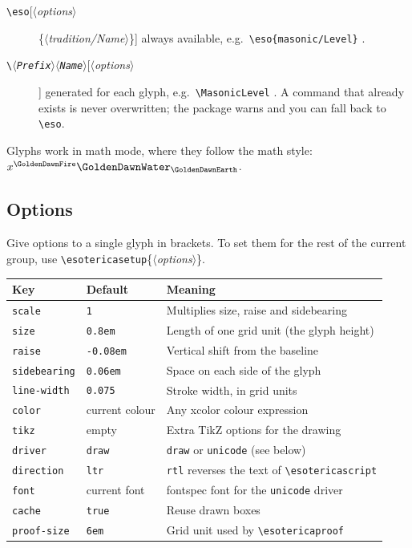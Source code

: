 \documentclass[11pt]{article}
\newcommand\pkg[1]{\textsf{#1}}
\newcommand\cs[1]{\texttt{\textbackslash#1}}
\newcommand\meta[1]{\ensuremath{\langle}\textit{#1}\ensuremath{\rangle}}
\newcommand\oarg[1]{[\meta{#1}]}
\begin{document}
\begin{description}
  \item[\cs{eso}\oarg{options}\{\meta{tradition/Name}\}]
    always available, e.g.\ \verb|\eso{masonic/Level}| .
  \item[\cs{\meta{Prefix}\meta{Name}}\oarg{options}]
    generated for each glyph, e.g.\ \verb|\MasonicLevel| \MasonicLevel.
    A command that already exists is never overwritten; the package warns
    and you can fall back to \cs{eso}.
\end{description}

Glyphs work in math mode, where they follow the math style:
$x^{\GoldenDawnFire} \GoldenDawnWater_{\GoldenDawnEarth}$.

\subsection{Options}

Give options to a single glyph in brackets.  To set them for the rest of the
current group, use \cs{esotericasetup}\{\meta{options}\}.

\begin{longtable}{lll}
\bfseries Key & \bfseries Default & \bfseries Meaning\\ \hline
\endhead
\texttt{scale}       & \texttt{1}       & Multiplies size, raise and sidebearing\\
\texttt{size}        & \texttt{0.8em}   & Length of one grid unit (the glyph height)\\
\texttt{raise}       & \texttt{-0.08em} & Vertical shift from the baseline\\
\texttt{sidebearing} & \texttt{0.06em}  & Space on each side of the glyph\\
\texttt{line-width}  & \texttt{0.075}   & Stroke width, in grid units\\
\texttt{color}       & current colour   & Any \pkg{xcolor} colour expression\\
\texttt{tikz}        & empty            & Extra TikZ options for the drawing\\
\texttt{driver}      & \texttt{draw}    & \texttt{draw} or \texttt{unicode} (see below)\\
\texttt{direction}   & \texttt{ltr}     & \texttt{rtl} reverses the text of \cs{esotericascript}\\
\texttt{font}        & current font     & \pkg{fontspec} font for the \texttt{unicode} driver\\
\texttt{cache}       & \texttt{true}    & Reuse drawn boxes\\
\texttt{proof-size}  & \texttt{6em}     & Grid unit used by \cs{esotericaproof}\\
\end{longtable}
\end{document}
